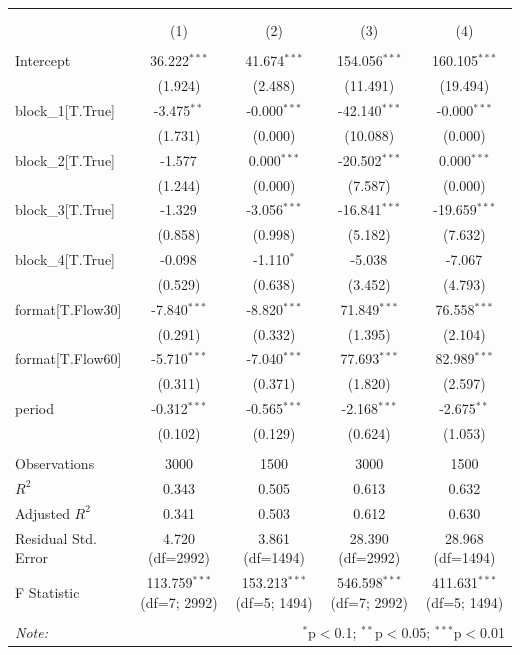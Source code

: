 \begin{table}[!htbp] \centering
\begin{tabular}{@{\extracolsep{5pt}}lcccc}
\\[-1.8ex]\hline
\hline \\[-1.8ex]
\\[-1.8ex] & (1) & (2) & (3) & (4) \\
\hline \\[-1.8ex]
 Intercept & 36.222$^{***}$ & 41.674$^{***}$ & 154.056$^{***}$ & 160.105$^{***}$ \\
& (1.924) & (2.488) & (11.491) & (19.494) \\
 block_1[T.True] & -3.475$^{**}$ & -0.000$^{***}$ & -42.140$^{***}$ & -0.000$^{***}$ \\
& (1.731) & (0.000) & (10.088) & (0.000) \\
 block_2[T.True] & -1.577$^{}$ & 0.000$^{***}$ & -20.502$^{***}$ & 0.000$^{***}$ \\
& (1.244) & (0.000) & (7.587) & (0.000) \\
 block_3[T.True] & -1.329$^{}$ & -3.056$^{***}$ & -16.841$^{***}$ & -19.659$^{***}$ \\
& (0.858) & (0.998) & (5.182) & (7.632) \\
 block_4[T.True] & -0.098$^{}$ & -1.110$^{*}$ & -5.038$^{}$ & -7.067$^{}$ \\
& (0.529) & (0.638) & (3.452) & (4.793) \\
 format[T.Flow30] & -7.840$^{***}$ & -8.820$^{***}$ & 71.849$^{***}$ & 76.558$^{***}$ \\
& (0.291) & (0.332) & (1.395) & (2.104) \\
 format[T.Flow60] & -5.710$^{***}$ & -7.040$^{***}$ & 77.693$^{***}$ & 82.989$^{***}$ \\
& (0.311) & (0.371) & (1.820) & (2.597) \\
 period & -0.312$^{***}$ & -0.565$^{***}$ & -2.168$^{***}$ & -2.675$^{**}$ \\
& (0.102) & (0.129) & (0.624) & (1.053) \\
\hline \\[-1.8ex]
 Observations & 3000 & 1500 & 3000 & 1500 \\
 $R^2$ & 0.343 & 0.505 & 0.613 & 0.632 \\
 Adjusted $R^2$ & 0.341 & 0.503 & 0.612 & 0.630 \\
 Residual Std. Error & 4.720 (df=2992) & 3.861 (df=1494) & 28.390 (df=2992) & 28.968 (df=1494) \\
 F Statistic & 113.759$^{***}$ (df=7; 2992) & 153.213$^{***}$ (df=5; 1494) & 546.598$^{***}$ (df=7; 2992) & 411.631$^{***}$ (df=5; 1494) \\
\hline
\hline \\[-1.8ex]
\textit{Note:} & \multicolumn{4}{r}{$^{*}$p$<$0.1; $^{**}$p$<$0.05; $^{***}$p$<$0.01} \\
\end{tabular}
\end{table}
